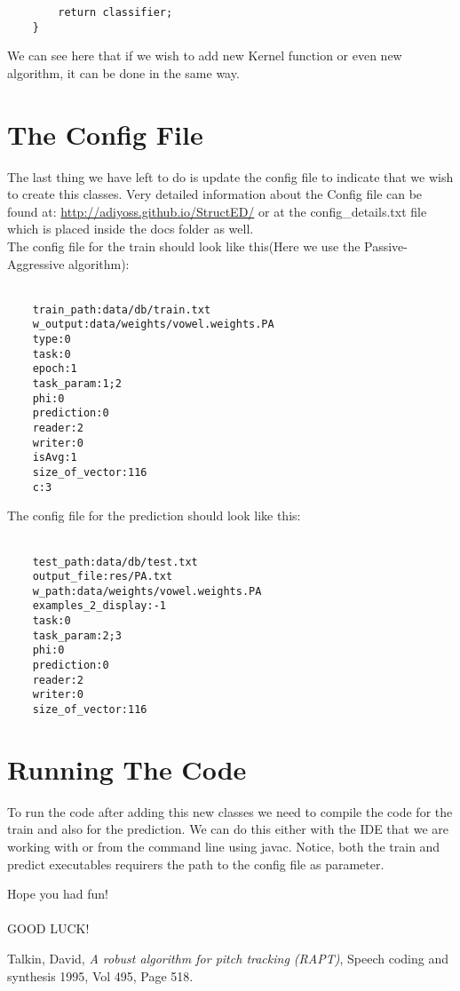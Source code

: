 \documentclass[11pt, oneside]{article}   	%
\begin{document}
\begin{lstlisting}
		return classifier;
	}
\end{lstlisting}

We can see here that if we wish to add new Kernel function or even new algorithm, it can be done in the same way.
\section{The Config File}
The last thing we have left to do is update the config file to indicate that we wish to create this classes.
Very detailed information about the Config file can be found at: \href{http://adiyoss.github.io/StructED/}{http://adiyoss.github.io/StructED/} or at the config\_details.txt file which is placed inside the docs folder as well.\\
The config file for the train should look like this(Here we use the Passive-Aggressive algorithm): \\ \\
\begin{lstlisting}
	train_path:data/db/train.txt
	w_output:data/weights/vowel.weights.PA
	type:0
	task:0
	epoch:1
	task_param:1;2
	phi:0
	prediction:0
	reader:2
	writer:0
	isAvg:1
	size_of_vector:116
	c:3
\end{lstlisting}
The config file for the prediction should look like this: \\ \\
\begin{lstlisting}
	test_path:data/db/test.txt
	output_file:res/PA.txt
	w_path:data/weights/vowel.weights.PA
	examples_2_display:-1
	task:0
	task_param:2;3
	phi:0
	prediction:0
	reader:2
	writer:0
	size_of_vector:116
\end{lstlisting}
\section{Running The Code}
To run the code after adding this new classes we need to compile the code for the train and also for the prediction. We can do this either with the IDE that we are working with or from the command line using javac.
Notice, both the train and predict executables requirers the path to the config file as parameter.

Hope you had fun!\\\\
GOOD LUCK! 

\begin{thebibliography}{} 

 Talkin, David, \emph{A robust algorithm for pitch tracking (RAPT)}, Speech coding and synthesis 1995, Vol 495, Page 518.

\end{thebibliography} 
\end{document}
